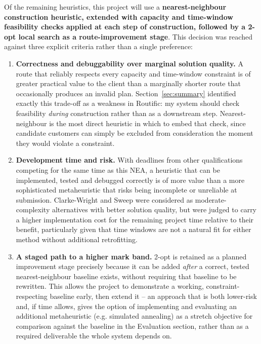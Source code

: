 \documentclass[11pt]{article}
\begin{document}
Of the remaining heuristics, this project will use a \textbf{nearest-neighbour construction heuristic, extended with capacity and time-window feasibility checks applied at each step of construction, followed by a 2-opt local search as a route-improvement stage}. This decision was reached against three explicit criteria rather than a single preference:

\begin{enumerate}
    \item \textbf{Correctness and debuggability over marginal solution quality.} A route that reliably respects every capacity and time-window constraint is of greater practical value to the client than a marginally shorter route that occasionally produces an invalid plan. Section~\ref{sec:summary} identified exactly this trade-off as a weakness in Routific: my system should check feasibility \textit{during} construction rather than as a downstream step. Nearest-neighbour is the most direct heuristic in which to embed that check, since candidate customers can simply be excluded from consideration the moment they would violate a constraint.
    \item \textbf{Development time and risk.} With deadlines from other qualifications competing for the same time as this NEA, a heuristic that can be implemented, tested and debugged correctly is of more value than a more sophisticated metaheuristic that risks being incomplete or unreliable at submission. Clarke-Wright and Sweep were considered as moderate-complexity alternatives with better solution quality, but were judged to carry a higher implementation cost for the remaining project time relative to their benefit, particularly given that time windows are not a natural fit for either method without additional retrofitting.
    \item \textbf{A staged path to a higher mark band.} 2-opt is retained as a planned improvement stage precisely because it can be added \textit{after} a correct, tested nearest-neighbour baseline exists, without requiring that baseline to be rewritten. This allows the project to demonstrate a working, constraint-respecting baseline early, then extend it -- an approach that is both lower-risk and, if time allows, gives the option of implementing and evaluating an additional metaheuristic (e.g. simulated annealing) as a stretch objective for comparison against the baseline in the Evaluation section, rather than as a required deliverable the whole system depends on.
\end{enumerate}
\end{document}
